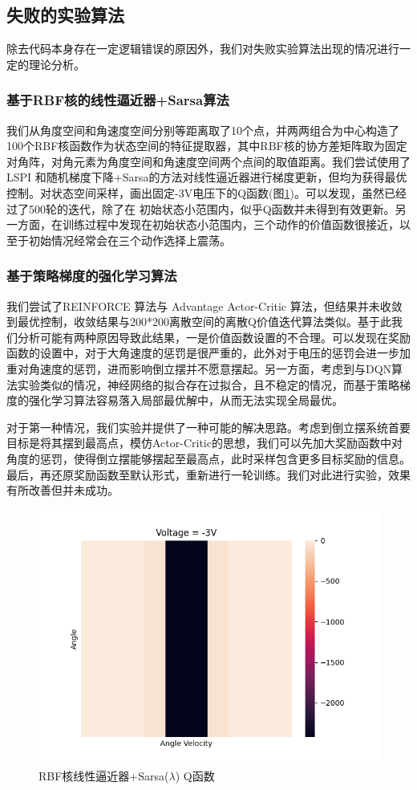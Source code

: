 \documentclass[conference,10pt]{IEEEtran}
\begin{document}
\subsection{失败的实验算法}
除去代码本身存在一定逻辑错误的原因外，我们对失败实验算法出现的情况进行一定的理论分析。
\subsubsection{基于RBF核的线性逼近器+Sarsa算法}
我们从角度空间和角速度空间分别等距离取了10个点，并两两组合为中心构造了100个RBF核函数作为状态空间的特征提取器，其中RBF核的协方差矩阵取为固定对角阵，对角元素为角度空间和角速度空间两个点间的取值距离。我们尝试使用了 LSPI 和随机梯度下降+Sarsa的方法对线性逼近器进行梯度更新，但均为获得最优控制。对状态空间采样，画出固定-3V电压下的Q函数(图\ref{RBF})。可以发现，虽然已经过了500轮的迭代，除了在 初始状态小范围内，似乎Q函数并未得到有效更新。另一方面，在训练过程中发现在初始状态小范围内，三个动作的价值函数很接近，以至于初始情况经常会在三个动作选择上震荡。
\subsubsection{基于策略梯度的强化学习算法}
我们尝试了REINFORCE 算法与 Advantage Actor-Critic 算法，但结果并未收敛到最优控制，收敛结果与200*200离散空间的离散Q价值迭代算法类似。基于此我们分析可能有两种原因导致此结果，一是价值函数设置的不合理。可以发现在奖励函数的设置中，对于大角速度的惩罚是很严重的，此外对于电压的惩罚会进一步加重对角速度的惩罚，进而影响倒立摆并不愿意摆起。另一方面，考虑到与DQN算法实验类似的情况，神经网络的拟合存在过拟合，且不稳定的情况，而基于策略梯度的强化学习算法容易落入局部最优解中，从而无法实现全局最优。

对于第一种情况，我们实验并提供了一种可能的解决思路。考虑到倒立摆系统首要目标是将其摆到最高点，模仿Actor-Critic的思想，我们可以先加大奖励函数中对角度的惩罚，使得倒立摆能够摆起至最高点，此时采样包含更多目标奖励的信息。最后，再还原奖励函数至默认形式，重新进行一轮训练。我们对此进行实验，效果有所改善但并未成功。
\begin{figure}
	\centering
	\includegraphics[scale=0.25]{figure/sarsa_lam_linear.png}
	\caption{RBF核线性逼近器+Sarsa($\lambda$) Q函数}
	\label{RBF}
\end{figure}
\end{document}
